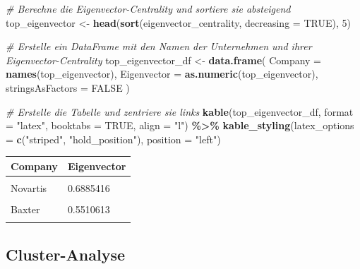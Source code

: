 \documentclass[
]{article}
\newenvironment{Shaded}{\begin{snugshade}}{\end{snugshade}}
\newcommand{\AttributeTok}[1]{\textcolor[rgb]{0.13,0.29,0.53}{#1}}
\newcommand{\CommentTok}[1]{\textcolor[rgb]{0.56,0.35,0.01}{\textit{#1}}}
\newcommand{\ConstantTok}[1]{\textcolor[rgb]{0.56,0.35,0.01}{#1}}
\newcommand{\DecValTok}[1]{\textcolor[rgb]{0.00,0.00,0.81}{#1}}
\newcommand{\FunctionTok}[1]{\textcolor[rgb]{0.13,0.29,0.53}{\textbf{#1}}}
\newcommand{\NormalTok}[1]{#1}
\newcommand{\OtherTok}[1]{\textcolor[rgb]{0.56,0.35,0.01}{#1}}
\newcommand{\SpecialCharTok}[1]{\textcolor[rgb]{0.81,0.36,0.00}{\textbf{#1}}}
\newcommand{\StringTok}[1]{\textcolor[rgb]{0.31,0.60,0.02}{#1}}
\begin{document}
\begin{Shaded}
\begin{Highlighting}[]
\CommentTok{\# Berechne die Eigenvector{-}Centrality und sortiere sie absteigend}
\NormalTok{top\_eigenvector }\OtherTok{\textless{}{-}} \FunctionTok{head}\NormalTok{(}\FunctionTok{sort}\NormalTok{(eigenvector\_centrality, }\AttributeTok{decreasing =} \ConstantTok{TRUE}\NormalTok{), }\DecValTok{5}\NormalTok{)}

\CommentTok{\# Erstelle ein DataFrame mit den Namen der Unternehmen und ihrer Eigenvector{-}Centrality}
\NormalTok{top\_eigenvector\_df }\OtherTok{\textless{}{-}} \FunctionTok{data.frame}\NormalTok{(}
  \AttributeTok{Company =} \FunctionTok{names}\NormalTok{(top\_eigenvector),}
  \AttributeTok{Eigenvector =} \FunctionTok{as.numeric}\NormalTok{(top\_eigenvector),}
  \AttributeTok{stringsAsFactors =} \ConstantTok{FALSE}
\NormalTok{)}

\CommentTok{\# Erstelle die Tabelle und zentriere sie links}
\FunctionTok{kable}\NormalTok{(top\_eigenvector\_df, }\AttributeTok{format =} \StringTok{"latex"}\NormalTok{, }\AttributeTok{booktabs =} \ConstantTok{TRUE}\NormalTok{, }\AttributeTok{align =} \StringTok{"l"}\NormalTok{) }\SpecialCharTok{\%\textgreater{}\%}
  \FunctionTok{kable\_styling}\NormalTok{(}\AttributeTok{latex\_options =} \FunctionTok{c}\NormalTok{(}\StringTok{"striped"}\NormalTok{, }\StringTok{"hold\_position"}\NormalTok{), }\AttributeTok{position =} \StringTok{"left"}\NormalTok{)}
\end{Highlighting}
\end{Shaded}

\begin{tabular}{ll}
\toprule
Company & Eigenvector\\
\midrule
\cellcolor{gray!10}{Takeda Pharmaceuticals} & \cellcolor{gray!10}{1.0000000}\\
Novartis & 0.6885416\\
\cellcolor{gray!10}{Pfizer} & \cellcolor{gray!10}{0.5750772}\\
Baxter & 0.5510613\\
\cellcolor{gray!10}{AstraZeneca} & \cellcolor{gray!10}{0.3694600}\\
\bottomrule
\end{tabular}

\subsection{Cluster-Analyse}\label{cluster-analyse}
\end{document}
